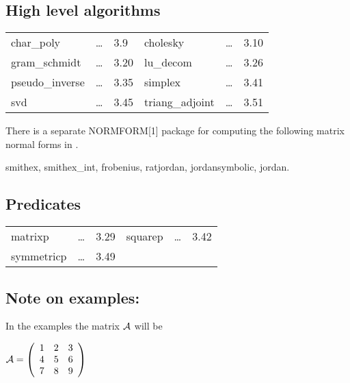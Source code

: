 \subsection{High level algorithms}

\begin{center}
\begin{tabular}{l l l l l l}
char\_poly       & \ldots & 3.9 & 
cholesky         & \ldots & 3.10 \\ 
gram\_schmidt    & \ldots & 3.20 & 
lu\_decom        & \ldots & 3.26 \\
pseudo\_inverse  & \ldots & 3.35 & 
simplex          & \ldots & 3.41 \\
svd              & \ldots & 3.45 & 
triang\_adjoint  & \ldots & 3.51
\end{tabular}
\end{center}

\vspace*{5mm}
There is a separate {\small NORMFORM}[1] package for computing 
the following matrix normal forms in \REDUCE.

\begin{center}
smithex, smithex\_int, frobenius, ratjordan, jordansymbolic, jordan.
\end{center}

\subsection{Predicates}

\begin{center}
\begin{tabular}{l l l l l l}
matrixp     & \ldots & 3.29 & 
squarep     & \ldots & 3.42 \\
symmetricp  & \ldots & 3.49 & 
\end{tabular}
\end{center}

\subsection*{Note on examples:} 

In the examples the matrix ${\cal A}$ will be 

\begin{flushleft}
\begin{math}
{\cal A} = \left( \begin{array}{ccc} 1 & 2 & 3 \\ 4 & 5 & 6 \\ 7 & 8 & 9
\end{array} \right)
\end{math}
\end{flushleft}


